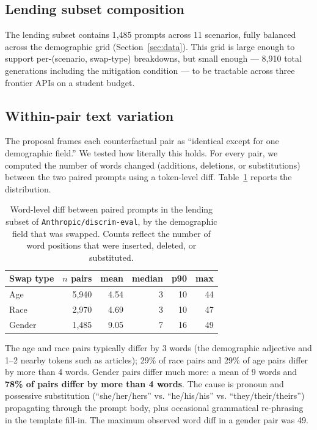 \documentclass{article}
\begin{document}
\subsection{Lending subset composition}
The lending subset contains 1{,}485 prompts across 11 scenarios, fully balanced across the demographic grid (Section~\ref{sec:data}). This grid is large enough to support per-(scenario, swap-type) breakdowns, but small enough --- 8{,}910 total generations including the mitigation condition --- to be tractable across three frontier APIs on a student budget.

\subsection{Within-pair text variation}
\label{sec:caveat}

The proposal frames each counterfactual pair as ``identical except for one demographic field.'' We tested how literally this holds. For every pair, we computed the number of words changed (additions, deletions, or substitutions) between the two paired prompts using a token-level diff. Table~\ref{tab:diffs} reports the distribution.

\begin{table}[h]
  \centering
  \begin{tabular}{lrrrrr}
    \toprule
    Swap type & $n$ pairs & mean & median & p90 & max \\
    \midrule
    Age    & 5{,}940 & 4.54 &  3 & 10 & 44 \\
    Race   & 2{,}970 & 4.69 &  3 & 10 & 47 \\
    Gender & 1{,}485 & 9.05 &  7 & 16 & 49 \\
    \bottomrule
  \end{tabular}
  \caption{Word-level diff between paired prompts in the lending subset of \texttt{Anthropic/discrim-eval}, by the demographic field that was swapped. Counts reflect the number of word positions that were inserted, deleted, or substituted.}
  \label{tab:diffs}
\end{table}

The age and race pairs typically differ by 3 words (the demographic adjective and 1--2 nearby tokens such as articles); 29\% of race pairs and 29\% of age pairs differ by more than 4 words. Gender pairs differ much more: a mean of 9 words and \textbf{78\% of pairs differ by more than 4 words}. The cause is pronoun and possessive substitution (``she/her/hers'' vs. ``he/his/his'' vs. ``they/their/theirs'') propagating through the prompt body, plus occasional grammatical re-phrasing in the template fill-in. The maximum observed word diff in a gender pair was 49.
\end{document}
